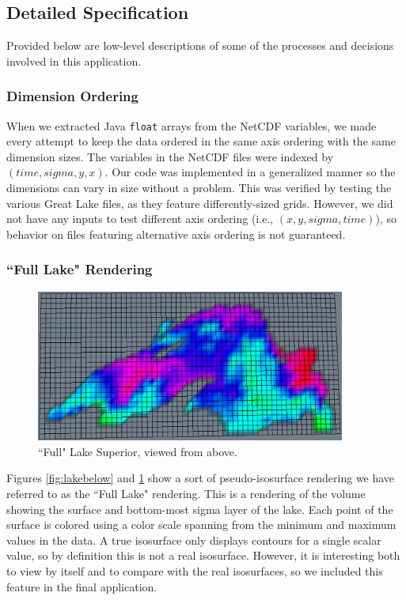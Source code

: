 \documentclass{article} %
\newcommand{\code}[1]{\texttt{#1}}
\begin{document}
\subsection{Detailed Specification}

Provided below are low-level descriptions of some of the processes and decisions involved in this application.

\subsubsection{Dimension Ordering}

When we extracted Java \code{float} arrays from the NetCDF variables, we made every attempt to keep the data ordered in the same axis ordering with the same dimension sizes.  The variables in the NetCDF files were indexed by $(time, sigma, y, x)$.  Our code was implemented in a generalized manner so the dimensions can vary in size without a problem.  This was verified by testing the various Great Lake files, as they feature differently-sized grids.  However, we did not have any inputs to test different axis ordering (i.e., $(x, y, sigma, time)$), so behavior on files featuring alternative axis ordering is not guaranteed. 

\subsubsection{``Full Lake" Rendering}\label{sec:fullLake}

\begin{figure}[htb]
   \centering
   \includegraphics[width=4in]{figures/lakeabove.eps}
   \caption{``Full" Lake Superior, viewed from above.}
   \label{fig:lakeabove}
\end{figure}

Figures \ref{fig:lakebelow} and \ref{fig:lakeabove} show a sort of pseudo-isosurface rendering we have referred to as the ``Full Lake" rendering.  This is a rendering of the volume showing the surface and bottom-most sigma layer of the lake.  Each point of the surface is colored using a color scale spanning from the minimum and maximum values in the data.  A true isosurface only displays contours for a single scalar value, so by definition this is not a real isosurface.  However, it is interesting both to view by itself and to compare with the real isosurfaces, so we included this feature in the final application.
\end{document}
